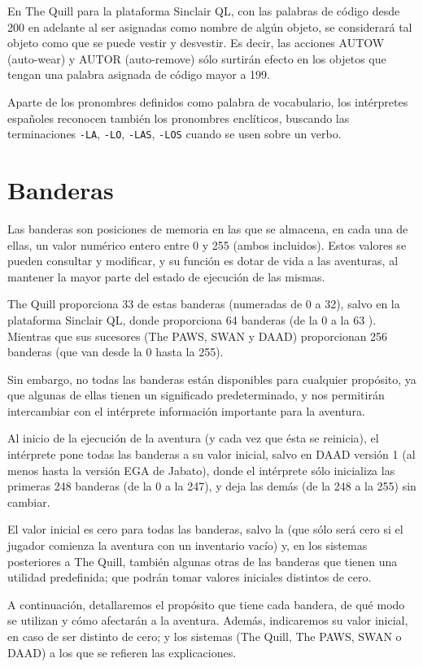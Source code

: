 \documentclass[11pt, a5paper]{article}
\newcommand{\quill}{\textsf{The Quill}\xspace}
\newcommand{\paw}{\textsf{The PAWS}\xspace}
\newcommand{\swan}{\textsf{SWAN}\xspace}
\newcommand{\daad}{\textsf{DAAD}\xspace}
\begin{document}
En \quill para la plataforma Sinclair QL, con las palabras de código desde 200 en adelante al ser asignadas como nombre de algún objeto, se considerará tal objeto como que se puede vestir y desvestir. Es decir, las acciones AUTOW (auto-wear) y AUTOR (auto-remove) sólo surtirán efecto en los objetos que tengan una palabra asignada de código mayor a 199.

Aparte de los pronombres definidos como palabra de vocabulario, los intérpretes españoles reconocen también los pronombres enclíticos, buscando las terminaciones \texttt{-LA}, \texttt{-LO}, \texttt{-LAS}, \texttt{-LOS} cuando se usen sobre un verbo.


\section{Banderas}

Las banderas son posiciones de memoria en las que se almacena, en cada una de ellas, un valor numérico entero entre 0 y 255 (ambos incluidos). Estos valores se pueden consultar y modificar, y su función es dotar de vida a las aventuras, al mantener la mayor parte del estado de ejecución de las mismas.

\quill proporciona 33 de estas banderas (numeradas de 0 a 32), salvo en la plataforma Sinclair QL, donde proporciona 64 banderas (de la 0 a la 63 \cite{QuillQL}). Mientras que sus sucesores (\paw, \swan y \daad) proporcionan 256 banderas (que van desde la 0 hasta la 255).

Sin embargo, no todas las banderas están disponibles para cualquier propósito, ya que algunas de ellas tienen un significado predeterminado, y nos permitirán intercambiar con el intérprete información importante para la aventura.

Al inicio de la ejecución de la aventura (y cada vez que ésta se reinicia), el intérprete pone todas las banderas a su valor inicial, salvo en \daad versión 1 (al menos hasta la versión EGA de Jabato), donde el intérprete sólo inicializa las primeras 248 banderas (de la 0 a la 247), y deja las demás (de la 248 a la 255) sin cambiar.

El valor inicial es cero para todas las banderas, salvo la  (que sólo será cero si el jugador comienza la aventura con un inventario vacío) y, en los sistemas posteriores a \quill, también algunas otras de las banderas que tienen una utilidad predefinida; que podrán tomar valores iniciales distintos de cero.

A continuación, detallaremos el propósito que tiene cada bandera, de qué modo se utilizan y cómo afectarán a la aventura. Además, indicaremos su valor inicial, en caso de ser distinto de cero; y los sistemas (\quill, \paw, \swan o \daad) a los que se refieren las explicaciones.
\end{document}
